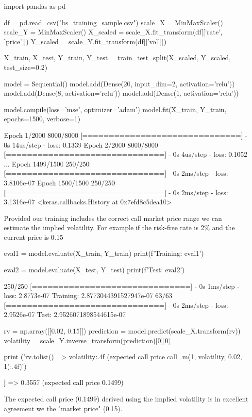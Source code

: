 \begin{ipython}
import pandas as pd

df = pd.read_csv("bs_training_sample.csv")
scale_X = MinMaxScaler()
scale_Y = MinMaxScaler()
X_scaled = scale_X.fit_transform(df[['rate', 'price']])
Y_scaled = scale_Y.fit_transform(df[['vol']])

X_train, X_test, Y_train, Y_test = train_test_split(X_scaled, 
                                                    Y_scaled, test_size=0.2)

model = Sequential()
model.add(Dense(20, input_dim=2, activation='relu'))
model.add(Dense(8, activation='relu'))
model.add(Dense(1, activation='relu'))

model.compile(loss='mse', optimizer='adam')
model.fit(X_train, Y_train, epochs=1500, verbose=1)
\end{ipython}
\begin{ioutput}
Epoch 1/2000
8000/8000 [==============================] - 0s 14us/step - loss: 0.1339
Epoch 2/2000
8000/8000 [==============================] - 0s 4us/step - loss: 0.1052
...
Epoch 1499/1500
250/250 [==============================] - 0s 2ms/step - loss: 3.8106e-07
Epoch 1500/1500
250/250 [==============================] - 0s 2ms/step - loss: 3.1316e-07
<keras.callbacks.History at 0x7efd8c5dea10>
\end{ioutput}

Provided our training includes the correct call market price range we can estimate the implied volatility. For example if the risk-free rate is 2\% and the current price is 0.15 

\begin{ipythonnon}
eval1 = model.evaluate(X_train, Y_train)
print(f'Training: {eval1}')

eval2 = model.evaluate(X_test, Y_test)
print(f'Test: {eval2}')
\end{ipythonnon}
\begin{ioutput}
250/250 [==============================] - 0s 1ms/step - loss: 2.8773e-07
Training: 2.8773044391527947e-07
63/63 [==============================] - 0s 2ms/step - loss: 2.9526e-07
Test: 2.9526071898544615e-07
\end{ioutput}

\begin{ipythonnon}
rv = np.array([[0.02, 0.15]])
prediction = model.predict(scale_X.transform(rv))
volatility = scale_Y.inverse_transform(prediction)[0][0]

print ('{rv.tolist()} => {volatility:.4f} (expected call price {call_m(1, volatility, 
	           0.02, 1):.4f})')
\end{ipythonnon}
\begin{ioutput}
[[0.02, 0.15]] => 0.3557 (expected call price 0.1499)
\end{ioutput}
\noindent
The expected call price (0.1499) derived using the implied volatility is in excellent agreement we the "market price" (0.15).

